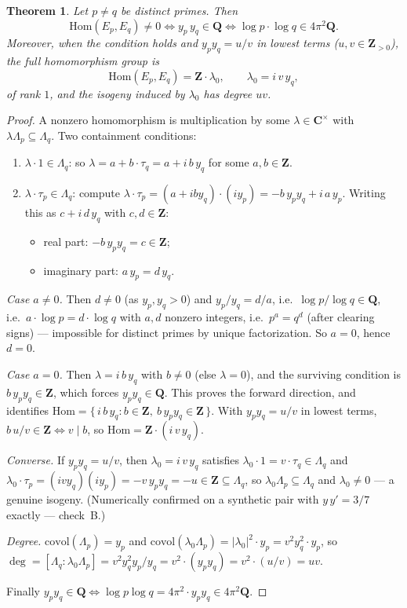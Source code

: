 \documentclass[11pt]{article}
\newtheorem{theorem}{Theorem}
\theoremstyle{definition}
\theoremstyle{remark}
\newcommand{\Z}{\mathbf{Z}}
\newcommand{\Q}{\mathbf{Q}}
\newcommand{\C}{\mathbf{C}}
\newcommand{\Hom}{\mathrm{Hom}}
\newcommand{\covol}{\mathrm{covol}}
\begin{document}
\begin{theorem}
\label{thm:isogeny}
Let $p \neq q$ be distinct primes. Then
\[
\Hom(E_p, E_q) \neq 0
\iff y_p\, y_q \in \Q
\iff \log p \cdot \log q \in 4\pi^2\Q .
\]
Moreover, when the condition holds and $y_p y_q = u/v$ in lowest terms
($u, v \in \Z_{>0}$), the full homomorphism group is
\[
\Hom(E_p, E_q) = \Z\cdot\lambda_0 , \qquad \lambda_0 = i\, v\, y_q ,
\]
of rank $1$, and the isogeny induced by $\lambda_0$ has degree $uv$.
\end{theorem}

\begin{proof}
A nonzero homomorphism is multiplication by some $\lambda \in \C^\times$ with
$\lambda\Lambda_p \subseteq \Lambda_q$. Two containment conditions:

\begin{enumerate}
\item $\lambda\cdot 1 \in \Lambda_q$: so
$\lambda = a + b\cdot\tau_q = a + i\, b\, y_q$ for some $a, b \in \Z$.
\item $\lambda\cdot\tau_p \in \Lambda_q$: compute
$\lambda\cdot\tau_p = (a + i b y_q)\cdot(i y_p) = -b\, y_p y_q + i\, a\, y_p$.
Writing this as $c + i\, d\, y_q$ with $c, d \in \Z$:
\begin{itemize}
\item real part: $-b\, y_p y_q = c \in \Z$;
\item imaginary part: $a\, y_p = d\, y_q$.
\end{itemize}
\end{enumerate}

\emph{Case $a \neq 0$.} Then $d \neq 0$ (as $y_p, y_q > 0$) and
$y_p/y_q = d/a$, i.e.\ $\log p/\log q \in \Q$, i.e.\
$a\cdot\log p = d\cdot\log q$ with $a, d$ nonzero integers, i.e.\
$p^a = q^d$ (after clearing signs) --- impossible for distinct primes by
unique factorization. So $a = 0$, hence $d = 0$.

\emph{Case $a = 0$.} Then $\lambda = i\, b\, y_q$ with $b \neq 0$ (else
$\lambda = 0$), and the surviving condition is $b\, y_p y_q \in \Z$, which
forces $y_p y_q \in \Q$. This proves the forward direction, and identifies
$\Hom = \{\, i\, b\, y_q : b \in \Z,\ b\, y_p y_q \in \Z \,\}$. With
$y_p y_q = u/v$ in lowest terms, $b\, u/v \in \Z \iff v \mid b$, so
$\Hom = \Z\cdot(i\, v\, y_q)$.

\emph{Converse.} If $y_p y_q = u/v$, then $\lambda_0 = i\, v\, y_q$ satisfies
$\lambda_0\cdot 1 = v\cdot\tau_q \in \Lambda_q$ and
$\lambda_0\cdot\tau_p = (i v y_q)(i y_p) = -v\, y_p y_q = -u \in \Z \subseteq
\Lambda_q$, so $\lambda_0\Lambda_p \subseteq \Lambda_q$ and
$\lambda_0 \neq 0$ --- a genuine isogeny. (Numerically confirmed on a
synthetic pair with $y\, y' = 3/7$ exactly --- check~B.)

\emph{Degree.} $\covol(\Lambda_p) = y_p$ and
$\covol(\lambda_0\Lambda_p) = |\lambda_0|^2\cdot y_p = v^2 y_q^2\cdot y_p$,
so $\deg = [\Lambda_q : \lambda_0\Lambda_p] = v^2 y_q^2 y_p / y_q
= v^2\cdot(y_p y_q) = v^2\cdot(u/v) = uv$.

Finally $y_p y_q \in \Q \iff \log p \log q = 4\pi^2\cdot y_p y_q \in 4\pi^2\Q$.
\end{proof}
\end{document}
